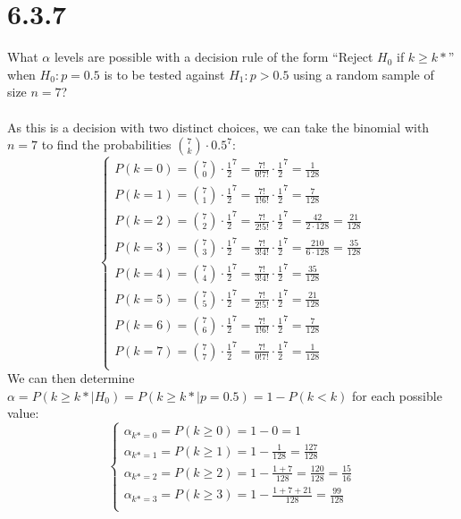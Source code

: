 \documentclass{article}
\begin{document}
{\section*{6.3.7}
What \(\alpha\) levels are possible with a decision rule of the form “Reject \(H_0\) if \(k \geq k*\)” when \(H_0: p = 0.5\) is to be tested against \(H_1: p > 0.5\) using a random sample of size \(n = 7\)?
\\
\\
As this is a decision with two distinct choices, we can take the binomial with \(n = 7\) to find the probabilities \(\binom{7}{k} \cdot 0.5^7\):
\begin{equation*}
\begin{cases}
P(k = 0) = \binom{7}{0} \cdot \frac{1}{2}^7 = \frac{7!}{0!7!} \cdot \frac{1}{2}^7 = \frac{1}{128} \\ 
P(k = 1) = \binom{7}{1} \cdot \frac{1}{2}^7 = \frac{7!}{1!6!} \cdot \frac{1}{2}^7 = \frac{7}{128} \\ 
P(k = 2) = \binom{7}{2} \cdot \frac{1}{2}^7 = \frac{7!}{2!5!} \cdot \frac{1}{2}^7 = \frac{42}{2 \cdot 128} = \frac{21}{128} \\ 
P(k = 3) = \binom{7}{3} \cdot \frac{1}{2}^7 = \frac{7!}{3!4!} \cdot \frac{1}{2}^7 = \frac{210}{6 \cdot 128} = \frac{35}{128} \\ 
P(k = 4) = \binom{7}{4} \cdot \frac{1}{2}^7 = \frac{7!}{3!4!} \cdot \frac{1}{2}^7 = \frac{35}{128} \\ 
P(k = 5) = \binom{7}{5} \cdot \frac{1}{2}^7 = \frac{7!}{2!5!} \cdot \frac{1}{2}^7 = \frac{21}{128} \\ 
P(k = 6) = \binom{7}{6} \cdot \frac{1}{2}^7 = \frac{7!}{1!6!} \cdot \frac{1}{2}^7 = \frac{7}{128} \\ 
P(k = 7) = \binom{7}{7} \cdot \frac{1}{2}^7 = \frac{7!}{0!7!} \cdot \frac{1}{2}^7 = \frac{1}{128} \\ 
\end{cases}
\end{equation*}
We can then determine \(\alpha = P(k \geq k* | H_0) = P(k \geq k* | p = 0.5) = 1 - P(k < k)\) for each possible value: 
\begin{equation*}
\begin{cases}
\alpha_{k* = 0} = P(k \geq 0) = 1 - 0 = 1 \\
\alpha_{k* = 1} = P(k \geq 1) = 1 - \frac{1}{128} = \frac{127}{128} \\
\alpha_{k* = 2} = P(k \geq 2) = 1 - \frac{1 + 7}{128} = \frac{120}{128} = \frac{15}{16} \\
\alpha_{k* = 3} = P(k \geq 3) = 1 - \frac{1 + 7 + 21}{128} = \frac{99}{128} \\

\end{cases}
\end{equation*}}
\end{document}
